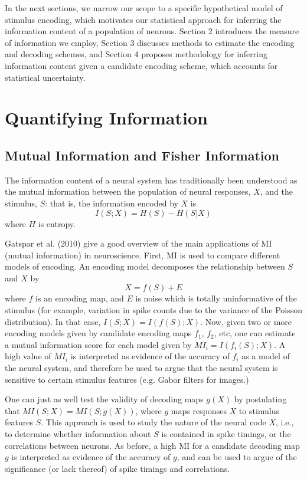 \documentclass[12pt]{article}
\begin{document}
In the next sections, we narrow our scope to a specific hypothetical
model of stimulus encoding, which motivates our statistical approach
for inferring the information content of a population of neurons.
Section 2 introduces the measure of information we employ, Section 3
discusses methods to estimate the encoding and decoding schemes, and
Section 4 proposes methodology for inferring information content given
a candidate encoding scheme, which accounts for statistical uncertainty.

\section{Quantifying Information}

\subsection{Mutual Information and Fisher Information}

The information content of a neural system has traditionally been
understood as the mutual information between the population of neural
responses, $X$, and the stimulus, $S$: that is, the information encoded by $X$ is
\[
I(S; X) = H(S) - H(S|X)
\]
where $H$ is entropy.

Gatspar et al. (2010) give a good overview of the main applications of
MI (mutual information) in neuroscience.  First, MI is used to compare
different models of encoding.  An encoding model decomposes the relationship
between $S$ and $X$ by
\[
X = f(S) + E
\]
where $f$ is an encoding map, and $E$ is noise which is totally
uninformative of the stimulus (for example, variation in spike counts
due to the variance of the Poisson distribution).  In that case, $I(S;
X) = I(f(S); X)$.  Now, given two or more encoding models given by
candidate encoding maps $f_1$, $f_2$, etc, one can estimate a mutual
information score for each model given by $MI_i = I(f_i(S); X)$. A
high value of $MI_i$ is interpreted as evidence of the accuracy of
$f_i$ as a model of the neural system, and therefore be used to argue
that the neural system is sensitive to certain stimulus features
(e.g. Gabor filters for images.)

One can just as well test the validity of decoding maps $g(X)$ by
postulating that $MI(S; X) = MI(S; g(X))$, where $g$ maps responses
$X$ to stimulus features $S$.  This approach is used to study the
nature of the neural code $X$, i.e., to determine whether information
about $S$ is contained in spike timings, or the correlations between
neurons.  As before, a high MI for a candidate decoding map $g$ is
interpreted as evidence of the accuracy of $g$, and can be used to argue
of the significance (or lack thereof) of spike timings and correlations.
\end{document}
